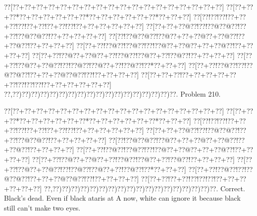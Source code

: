 \documentclass[a5paper]{article}
\begin{document}
\begin{center}
{\goo
\0??[\0??+\0??+\0??+\0??+\0??+\0??+\0??+\0??+\0??+\0??+\0??+\0??+\0??+\0??+\0??+\0??+\0??+\0??]
\0??[\0??+\0??+\0??*\0??+\0??+\0??+\0??+\0??+\0??*\0??+\0??+\0??+\0??+\0??+\0??*\0??+\0??+\0??]
\0??[\0??!\0??!\0??!\0??+\0??+\0??!\0??!\0??+\0??!\0??+\0??!\0??!\0??+\0??+\0??+\0??+\0??+\0??]
\0??[\0??+\0??+\0??@\0??!\0??!\0??@\0??@\0??!\0??+\0??!\0??@\0??@\0??!\0??+\0??+\0??+\0??+\0??]
\0??[\0??!\0??@\0??@\0??!\0??@\0??+\0??+\0??@\0??+\0??@\0??!\0??+\0??@\0??!\0??+\0??+\0??+\0??]
\0??[\0??+\0??!\0??@\0??!\0??@\0??!\0??!\0??@\0??+\0??@\0??+\0??+\0??@\0??!\0??+\0??+\0??+\0??]
\0??[\0??+\0??!\0??@\0??+\0??@\0??+\0??!\0??@\0??!\0??@\0??+\0??!\0??@\0??!\0??+\0??+\0??+\0??]
\0??[\0??+\0??!\0??@\0??+\0??@\0??!\0??!\0??@\0??!\0??@\0??+\0??!\0??@\0??!\0??*\0??+\0??+\0??]
\0??[\0??+\0??!\0??@\0??!\0??!\0??@\0??@\0??!\0??+\0??+\0??@\0??@\0??!\0??!\0??+\0??+\0??+\0??]
\0??[\0??+\0??+\0??!\0??+\0??+\0??+\0??+\0??+\0??!\0??!\0??!\0??!\0??+\0??+\0??+\0??+\0??+\0??]
\0??,\0??)\0??)\0??)\0??)\0??)\0??)\0??)\0??)\0??)\0??)\0??)\0??)\0??)\0??)\0??)\0??)\0??)\0??.
}
Problem 210.

\end{center}
\begin{center}
{\goo
\0??[\0??+\0??+\0??+\0??+\0??+\0??+\0??+\0??+\0??+\0??+\0??+\0??+\0??+\0??+\0??+\0??+\0??+\0??]
\0??[\0??+\0??+\0??*\0??+\0??+\0??+\0??+\0??+\0??*\0??+\0??+\0??+\0??+\0??+\0??*\0??+\0??+\0??]
\0??[\0??!\0??!\0??!\0??+\0??+\0??!\0??!\0??+\0??!\0??+\0??!\0??!\0??+\0??+\0??+\0??+\0??+\0??]
\0??[\0??+\0??+\0??@\0??!\0??!\0??@\0??@\0??!\0??+\0??!\0??@\0??@\0??!\0??+\0??+\0??+\0??+\0??]
\0??[\0??!\0??@\0??@\0??!\0??@\0??+\0??+\0??@\0??+\0??@\0??!\0??+\0??@\0??!\0??+\0??+\0??+\0??]
\0??[\0??+\0??!\0??@\0??!\0??@\0??!\0??!\0??@\0??+\0??@\0??+\0??+\0??@\0??!\0??+\0??+\0??+\0??]
\0??[\0??+\0??!\0??@\0??+\0??@\0??+\0??!\0??@\0??!\0??@\0??+\0??!\0??@\0??!\0??+\0??+\0??+\0??]
\0??[\0??+\0??!\0??@\0??+\0??@\0??!\0??!\0??@\0??!\0??@\0??+\0??!\0??@\0??!\0??*\0??+\0??+\0??]
\0??[\0??+\0??!\0??@\0??!\0??!\0??@\0??@\0??!\0??+\0??+\0??@\0??@\0??!\0??!\0??+\0??+\0??+\0??]
\0??[\0??+\0??!\0??+\0??!\0??!\0??!\0??!\0??+\0??+\0??+\0??+\0??+\0??]
\0??,\0??)\0??)\0??)\0??)\0??)\0??)\0??)\0??)\0??)\0??)\0??)\0??)\0??)\0??)\0??)\0??)\0??)\0??.
}
Correct. Black's dead. Even if black ataris at A now, white can ignore it because black still can't make two eyes.

\end{center}
\end{document}
